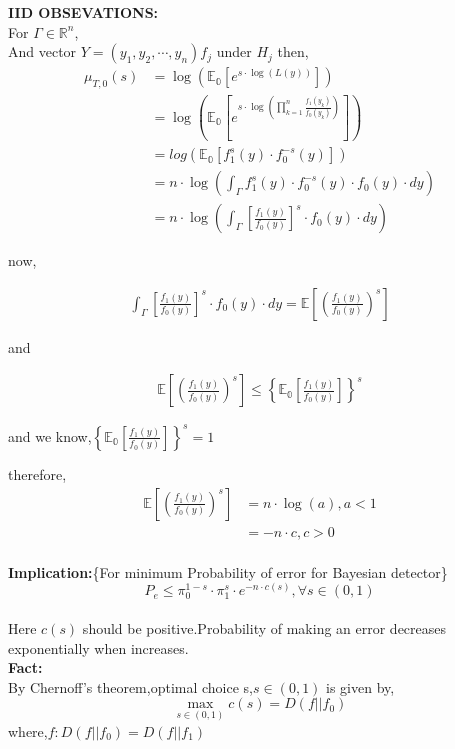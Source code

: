 \documentclass[a4paper,english,12pt]{article}
\begin{document}
\begin{exmp}
\textbf{IID OBSEVATIONS:}\\ 
For $\Gamma\in \mathbb{R}^n$,\\
And vector $Y=(y_1,y_2,\cdots,y_n)f_j$ under $H_j$ then,
\begin{align*}
\mu_{T,0}(s)&=\log\left(\mathbb{E_0}\left[e^{s\cdot\log(L(y))}\right]\right)\\
&=\log\left(\mathbb{E_0}\left[e^{s\cdot\log\left(\prod_{k=1}^n\frac{f_1(y_k)}{f_0(y_k)}\right)}\right]\right)\\
&=log\left(\mathbb{E_0}\left[f_1^{s}(y)\cdot f_0^{-s}(y)\right]\right)\\
&= n\cdot\log\left(\int_{\Gamma}{f_1^{s}(y)\cdot f_0^{-s}(y)\cdot f_0(y)}\cdot dy\right)\\
&= n\cdot\log\left(\int_{\Gamma}{\left[\frac{f_1(y)}{f_0(y)}\right]^{s}\cdot f_0(y)}\cdot dy \right)
\end{align*}
\begin{flushleft}
now,
\end{flushleft}
\begin{align*}\int_{\Gamma}{\left[\frac{f_1(y)}{f_0(y)}\right]^{s}\cdot f_0(y)}\cdot dy =\mathbb{E}\left[\left(\frac{f_1(y)}{f_0(y)}\right)^s\right]
\end{align*}
\begin{flushleft}
and
\end{flushleft}
\begin{align*}
\mathbb{E}\left[\left(\frac{f_1(y)}{f_0(y)}\right)^s\right]\leq\left\{\mathbb{E_0}\left[\frac{f_1(y)}{f_0(y)}\right]\right\}^s
\end{align*}
\begin{flushleft}
and we know,$\left\{\mathbb{E_0}\left[\frac{f_1(y)}{f_0(y)}\right]\right\}^s = 1$
\end{flushleft}
therefore,
\begin{align*}
\mathbb{E}\left[\left(\frac{f_1(y)}{f_0(y)}\right)^s\right] &= n\cdot \log(a),a<1\\
&= -n\cdot c,c>0 \\
\end{align*}
\end{exmp}
\textbf{Implication:}\{For minimum Probability of error for Bayesian detector\}\\
\[P_e\leq \pi_0^{1-s}\cdot \pi_1^s\cdot e^{-n\cdot c(s)},\forall s\in (0,1)\]\\
Here $c(s)$ should be positive.Probability of making an error decreases exponentially when increases. \\
\textbf{Fact:}\\
By Chernoff's theorem,optimal choice s,$s\in(0,1)$ is given by,\\
\[\max_{s\in (0,1)}{c(s)}=D(f||f_0)\]
where,$f:D(f||f_0)=D(f||f_1)$
\end{document}
